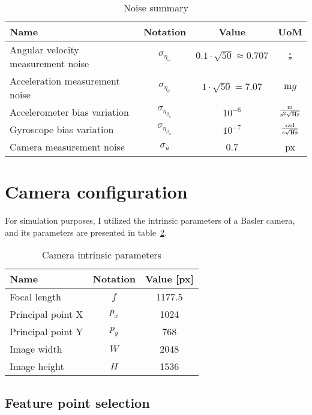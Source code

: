 \begin{table}[!ht]
    \centering
    \begin{tabular}{l c c c}
         Name & Notation & Value & UoM \\ 
         \toprule
         Angular velocity measurement noise & $\sigma_{\eta_\omega}$ & $0.1\cdot\sqrt{50}\approx 0.707$ & $\si{\frac{\circ}{\second}}$ \\
         Acceleration measurement noise & $\sigma_{\eta_a}$ & $1\cdot\sqrt{50}=7.07$ & $\si{\milli g}$ \\
         Accelerometer bias variation & $\sigma_{\eta_{\beta_a}}$ & $10^{-6}$ & $\si{\frac{\meter}{\second\squared\sqrt{\hertz}}}$ \\
         Gyroscope bias variation & $\sigma_{\eta_{\beta_\omega}}$ & $10^{-7}$ & $\si{\frac{\radian}{\second\sqrt{\hertz}}}$ \\
         Camera measurement noise & $\sigma_u$ & 0.7 & \si{px}
    \end{tabular}
    \caption{Noise summary}\label{tab:noises}
\end{table}

\section{Camera configuration}

For simulation purposes, I utilized the intrinsic parameters of a Basler camera, and its parameters are presented in table~\ref{tab:cam-intrinsic}.
\begin{table}[!ht]
    \centering
    \begin{tabular}{l c c}
         Name & Notation & Value [px] \\ 
         \toprule
         Focal length & $f$ &  1177.5 \\
         Principal point X & $p_x$ & 1024 \\
         Principal point Y & $p_y$ & 768 \\
         Image width & $W$ & 2048 \\
         Image height & $H$ & 1536
    \end{tabular}
    \caption{Camera intrinsic parameters}\label{tab:cam-intrinsic}
\end{table}

\subsection{Feature point selection}

